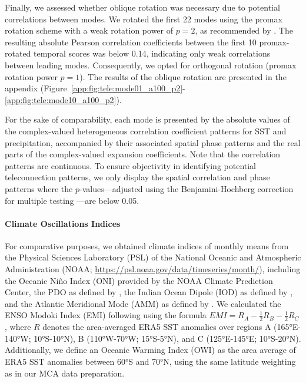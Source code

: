 Finally, we assessed whether oblique rotation was necessary due to potential correlations between modes. We rotated the first 22 modes using the promax rotation scheme \cite{hendrickson_promax_1964} with a weak rotation power of $p=2$, as recommended by \citet{richman_rotation_1986}. The resulting absolute Pearson correlation coefficients between the first 10 promax-rotated temporal scores was below \num{0.14}, indicating only weak correlations between leading modes. Consequently, we opted for orthogonal rotation (promax rotation power $p=1$). The results of the oblique rotation are presented in the appendix (Figure~\ref{app:fig:tele:mode01_a100_p2}-\ref{app:fig:tele:mode10_a100_p2}). 

For the sake of comparability, each mode is presented by the absolute values of the complex-valued heterogeneous correlation coefficient patterns for SST and precipitation, accompanied by their associated spatial phase patterns and the real parts of the complex-valued expansion coefficients. Note that the correlation patterns are continuous. To ensure objectivity in identifying potential teleconnection patterns, we only display the spatial correlation and phase patterns where the $p$-values---adjusted using the Benjamini-Hochberg correction for multiple testing \cite{benjamini_controlling_1995}---are below \num{0.05}.

\paragraph{Climate Oscillations Indices}
For comparative purposes, we obtained climate indices of monthly means from the Physical Sciences Laboratory (PSL) of the National Oceanic and Atmospheric Administration (NOAA; \url{https://psl.noaa.gov/data/timeseries/month/}), including the Oceanic Niño Index (ONI) provided by the NOAA Climate Prediction Center, the PDO as defined by \citet{mantua_pacific-decadal_2002}, the Indian Ocean Dipole (IOD) as defined by \citet{saji_possible_2003}, and the Atlantic Meridional Mode (AMM) as defined by \citet{chiang_analogous_2004}. We calculated the ENSO Modoki Index (EMI) following \citet{ashok_nino_2007} using the formula $EMI = R_A - \frac{1}{2}R_B - \frac{1}{2}R_C$, where $R$ denotes the area-averaged ERA5 SST anomalies over regions A (\ang{165}E-\ang{140}W; \ang{10}S-\ang{10}N), B (\ang{110}W-\ang{70}W; \ang{15}S-\ang{5}N), and C (\ang{125}E-\ang{145}E; \ang{10}S-\ang{20}N). Additionally, we define an Oceanic Warming Index (OWI) as the area average of ERA5 SST anomalies between \ang{60}S and \ang{70}N, using the same latitude weighting as in our MCA data preparation. 

